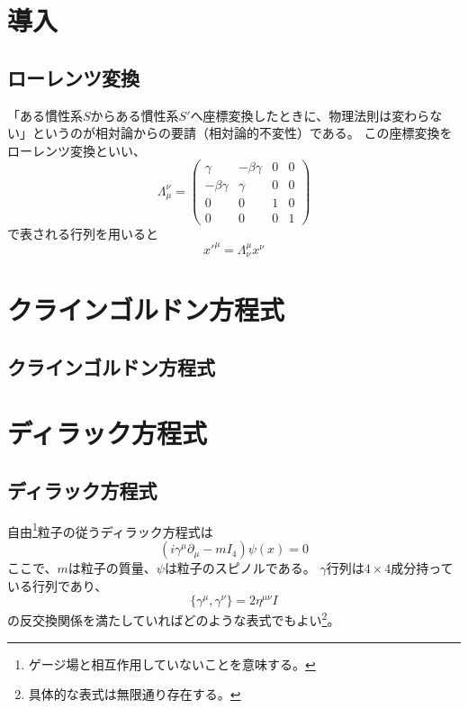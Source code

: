 \documentclass[a4paper,11pt,uplatex]{jsreport}
\begin{document}
\chapter{導入}
\section{ローレンツ変換}
「ある慣性系$S$からある慣性系$S\prime$へ座標変換したときに、物理法則は変わらない」というのが相対論からの要請（相対論的不変性）である。
この座標変換をローレンツ変換といい、
\begin{equation}
  \Lambda_{\mu}^{\nu} = \left(
    \begin{array}{cccc}
      \gamma       & -\beta\gamma & 0 & 0 \\
      -\beta\gamma & \gamma       & 0 & 0 \\
      0            & 0            & 1 & 0 \\
      0            & 0            & 0 & 1
    \end{array}
  \right)
\end{equation}
で表される行列を用いると
\begin{equation}
  x\prime^{\mu} = \Lambda^\mu_\nu x^\nu
\end{equation}

\chapter{クラインゴルドン方程式}
\section{クラインゴルドン方程式}

\chapter{ディラック方程式}
\section{ディラック方程式}

自由\footnote{ゲージ場と相互作用していないことを意味する。}粒子の従うディラック方程式は
\begin{equation}
  (i\gamma^{\mu}\partial_{\mu}-mI_4)\psi(x)=0
\end{equation}
ここで、$m$は粒子の質量、$\psi$は粒子のスピノルである。
$\gamma$行列は$4\times4$成分持っている行列であり、
\begin{equation}
  \{ \gamma^{\mu}, \gamma^{\nu} \} = 2\eta^{\mu\nu}I
\end{equation}
の反交換関係を満たしていればどのような表式でもよい\footnote{具体的な表式は無限通り存在する。}。
\end{document}
